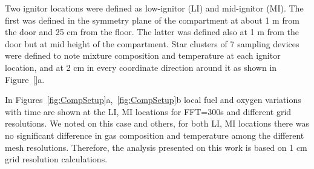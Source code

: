 \documentclass[12pt,letterpaper]{article}
\begin{document}
\begin{flushleft}
Two ignitor locations were defined as low-ignitor (LI) and mid-ignitor (MI). The first was defined in the symmetry plane of the compartment at about 1 m from the door and 25 cm from the floor. The latter was defined also at 1 m from the door but at mid height of the compartment. Star clusters of 7 sampling devices were defined to note mixture composition and temperature at each ignitor location, and at 2 cm in every coordinate direction around it as shown in Figure~\ref{}a.

In Figures~\ref{fig:CompSetup}a,~\ref{fig:CompSetup}b local fuel and oxygen variations with time are shown at the LI, MI locations for FFT=300s and different grid resolutions. We noted on this case and others, for both LI, MI locations there was no significant difference in gas composition and temperature among the different mesh resolutions. Therefore, the analysis presented on this work is based on 1 cm grid resolution calculations.


\end{flushleft}
\end{document}
